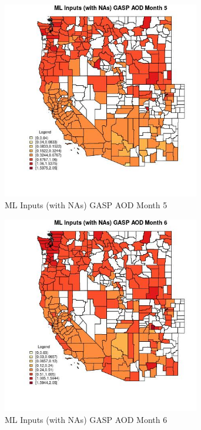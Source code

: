\begin{figure} 
\centering  
\includegraphics[width=0.77\textwidth]{Code_Outputs/Report_ML_input_PM25_Step4_part_e_de_duplicated_aves_compiled_2019-05-21wNAs_CountyGASP_AODmedianMonth5.jpg} 
\caption{\label{fig:Report_ML_input_PM25_Step4_part_e_de_duplicated_aves_compiled_2019-05-21wNAsCountyGASP_AODmedianMonth5}ML Inputs (with NAs) GASP AOD Month 5} 
\end{figure} 
 

\begin{figure} 
\centering  
\includegraphics[width=0.77\textwidth]{Code_Outputs/Report_ML_input_PM25_Step4_part_e_de_duplicated_aves_compiled_2019-05-21wNAs_CountyGASP_AODmedianMonth6.jpg} 
\caption{\label{fig:Report_ML_input_PM25_Step4_part_e_de_duplicated_aves_compiled_2019-05-21wNAsCountyGASP_AODmedianMonth6}ML Inputs (with NAs) GASP AOD Month 6} 
\end{figure} 
 

